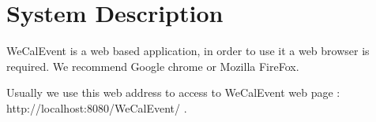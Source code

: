 \section{System Description}

\par \qquad WeCalEvent is a web based application, in order to use it a web browser is required. We recommend Google chrome or Mozilla FireFox.
\par Usually we use this web address to access to WeCalEvent web page : http://localhost:8080/WeCalEvent/ .

